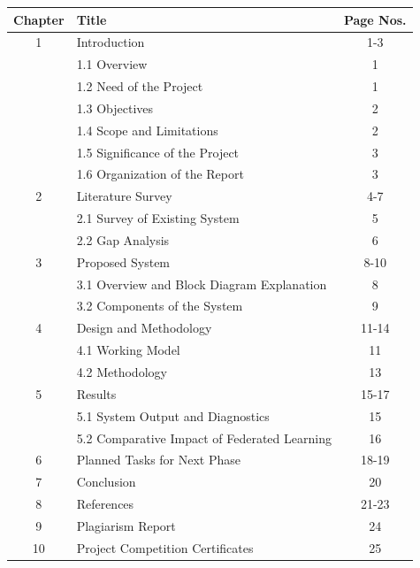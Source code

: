 \documentclass[12pt,a4paper]{report}
\begin{document}
\begin{tabular}{|c|l|c|}
\hline
\textbf{Chapter} & \textbf{Title} & \textbf{Page Nos.} \\ \hline
1 & Introduction & 1-3 \\ \hline
  & 1.1 Overview & 1 \\ \hline
  & 1.2 Need of the Project & 1 \\ \hline
  & 1.3 Objectives & 2 \\ \hline
  & 1.4 Scope and Limitations & 2 \\ \hline
  & 1.5 Significance of the Project & 3 \\ \hline
  & 1.6 Organization of the Report & 3 \\ \hline

2 & Literature Survey & 4-7 \\ \hline
  & 2.1 Survey of Existing System & 5 \\ \hline
  & 2.2 Gap Analysis & 6 \\ \hline

3 & Proposed System & 8-10\\ \hline
  & 3.1 Overview and Block Diagram Explanation & 8 \\ \hline
  & 3.2 Components of the System & 9 \\ \hline

4 & Design and Methodology & 11-14 \\ \hline
  & 4.1 Working Model  & 11\\ \hline
  & 4.2 Methodology  & 13 \\ \hline

5 & Results & 15-17 \\ \hline
  & 5.1 System Output and Diagnostics & 15 \\ \hline
  & 5.2 Comparative Impact of Federated Learning & 16 \\ \hline

6 & Planned Tasks for Next Phase & 18-19 \\ \hline
7 & Conclusion & 20\\ \hline
8 & References & 21-23 \\ \hline
9 & Plagiarism Report & 24\\ \hline
10 & Project Competition Certificates & 25\\ \hline
\end{tabular}

\newpage

\end{document}
